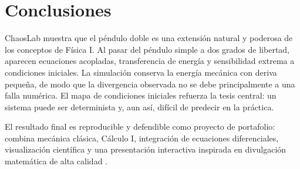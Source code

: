 \documentclass[reprint,amsmath,amssymb,aps,pra,nofootinbib,floatfix,showkeys]{revtex4-2}
\begin{document}
\section{Conclusiones}

ChaosLab muestra que el p\'endulo doble es una extensi\'on natural y poderosa de los conceptos de F\'isica I. Al pasar del p\'endulo simple a dos grados de libertad, aparecen ecuaciones acopladas, transferencia de energ\'ia y sensibilidad extrema a condiciones iniciales. La simulaci\'on conserva la energ\'ia mec\'anica con deriva peque\~na, de modo que la divergencia observada no se debe principalmente a una falla num\'erica. El mapa de condiciones iniciales refuerza la tesis central: un sistema puede ser determinista y, aun as\'i, dif\'icil de predecir en la pr\'actica.

El resultado final es reproducible y defendible como proyecto de portafolio: combina mec\'anica cl\'asica, C\'alculo I, integraci\'on de ecuaciones diferenciales, visualizaci\'on cient\'ifica y una presentaci\'on interactiva inspirada en divulgaci\'on matem\'atica de alta calidad \cite{twoswap_swaptube}.



\end{document}
